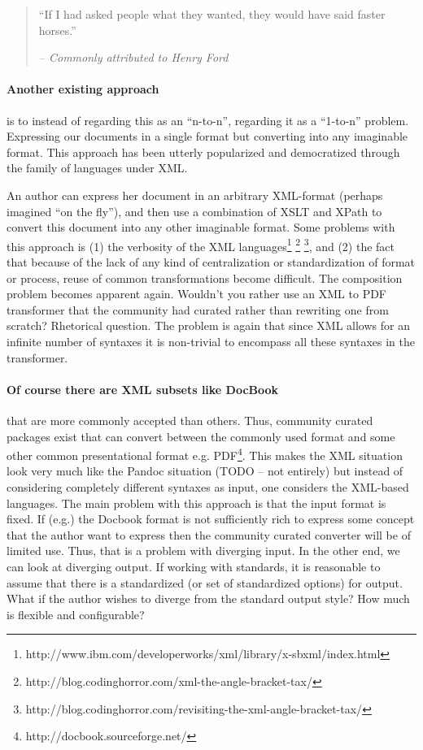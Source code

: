 \documentclass{scrreprt}
\begin{document}
\begin{quote}
``If I had asked people what they wanted, they would have said faster horses.''
\begin{flushright}
\textit{-- Commonly attributed to Henry Ford}
\end{flushright}
\end{quote}


\paragraph{Another existing approach} is to instead of regarding this as an ``n-to-n'', regarding it as a ``1-to-n'' problem. Expressing our documents in a single format but converting into any imaginable format. This approach has been utterly popularized and democratized through the family of languages under XML.

An author can express her document in an arbitrary XML-format (perhaps imagined ``on the fly''), and then use a combination of XSLT and XPath to convert this document into any other imaginable format. Some problems with this approach is (1) the verbosity of the XML languages\footnote{http://www.ibm.com/developerworks/xml/library/x-sbxml/index.html} \footnote{http://blog.codinghorror.com/xml-the-angle-bracket-tax/} \footnote{http://blog.codinghorror.com/revisiting-the-xml-angle-bracket-tax/}, and (2) the fact that because of the lack of any kind of centralization or standardization of format or process, reuse of common transformations become difficult. The composition problem becomes apparent again. Wouldn't you rather use an XML to PDF transformer that the community had curated rather than rewriting one from scratch? Rhetorical question. The problem is again that since XML allows for an infinite number of syntaxes it is non-trivial to encompass all these syntaxes in the transformer.

\paragraph{Of course there are XML subsets like DocBook} that are more commonly accepted than others. Thus, community curated packages exist that can convert between the commonly used format and some other common presentational format e.g. PDF\footnote{http://docbook.sourceforge.net/}. This makes the XML situation look very much like the Pandoc situation (TODO -- not entirely) but instead of considering completely different syntaxes as input, one considers the XML-based languages. The main problem with this approach is that the input format is fixed. If (e.g.) the Docbook format is not sufficiently rich to express some concept that the author want to express then the community curated converter will be of limited use. Thus, that is a problem with diverging input. In the other end, we can look at diverging output. If working with standards, it is reasonable to assume that there is a standardized (or set of standardized options) for output. What if the author wishes to diverge from the standard output style? How much is flexible and configurable?
\end{document}
